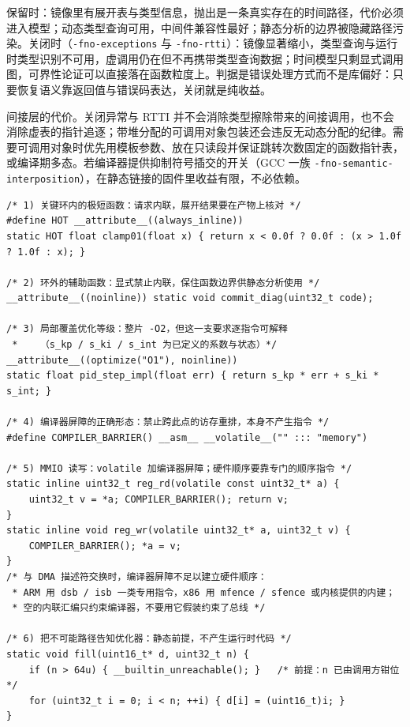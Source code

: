 \documentclass[12pt,a4paper,fontset=fandol]{ctexbook}
\newcommand{\Tp}[1]{\texttt{#1}}
\begin{document}
\begin{compare}[title={保留异常与 RTTI，还是关闭它们}]
保留时：镜像里有展开表与类型信息，抛出是一条真实存在的时间路径，代价必须进入模型；动态类型查询可用，中间件兼容性最好；静态分析的边界被隐藏路径污染。关闭时（\Tp{-fno-exceptions} 与 \Tp{-fno-rtti}）：镜像显著缩小，类型查询与运行时类型识别不可用，虚调用仍在但不再携带类型查询数据；时间模型只剩显式调用图，可界性论证可以直接落在函数粒度上。判据是错误处理方式而不是库偏好：只要恢复语义靠返回值与错误码表达，关闭就是纯收益。
\end{compare}

间接层的代价。关闭异常与 RTTI 并不会消除类型擦除带来的间接调用，也不会消除虚表的指针追逐；带堆分配的可调用对象包装还会违反无动态分配的纪律。需要可调用对象时优先用模板参数、放在只读段并保证跳转次数固定的函数指针表，或编译期多态。若编译器提供抑制符号插交的开关（GCC 一族 \Tp{-fno-semantic-interposition}），在静态链接的固件里收益有限，不必依赖。

\begin{lstlisting}[style=cstyle,caption={C：局部钉定：用属性覆盖内联与优化等级，以及屏障的正确形态},label={lst:ch13-pin}]
/* 1) 关键环内的极短函数：请求内联，展开结果要在产物上核对 */
#define HOT __attribute__((always_inline))
static HOT float clamp01(float x) { return x < 0.0f ? 0.0f : (x > 1.0f ? 1.0f : x); }

/* 2) 环外的辅助函数：显式禁止内联，保住函数边界供静态分析使用 */
__attribute__((noinline)) static void commit_diag(uint32_t code);

/* 3) 局部覆盖优化等级：整片 -O2，但这一支要求逐指令可解释
 *    （s_kp / s_ki / s_int 为已定义的系数与状态）*/
__attribute__((optimize("O1"), noinline))
static float pid_step_impl(float err) { return s_kp * err + s_ki * s_int; }

/* 4) 编译器屏障的正确形态：禁止跨此点的访存重排，本身不产生指令 */
#define COMPILER_BARRIER() __asm__ __volatile__("" ::: "memory")

/* 5) MMIO 读写：volatile 加编译器屏障；硬件顺序要靠专门的顺序指令 */
static inline uint32_t reg_rd(volatile const uint32_t* a) {
    uint32_t v = *a; COMPILER_BARRIER(); return v;
}
static inline void reg_wr(volatile uint32_t* a, uint32_t v) {
    COMPILER_BARRIER(); *a = v;
}
/* 与 DMA 描述符交换时，编译器屏障不足以建立硬件顺序：
 * ARM 用 dsb / isb 一类专用指令，x86 用 mfence / sfence 或内核提供的内建；
 * 空的内联汇编只约束编译器，不要用它假装约束了总线 */

/* 6) 把不可能路径告知优化器：静态前提，不产生运行时代码 */
static void fill(uint16_t* d, uint32_t n) {
    if (n > 64u) { __builtin_unreachable(); }   /* 前提：n 已由调用方钳位 */
    for (uint32_t i = 0; i < n; ++i) { d[i] = (uint16_t)i; }
}
\end{lstlisting}
\end{document}

